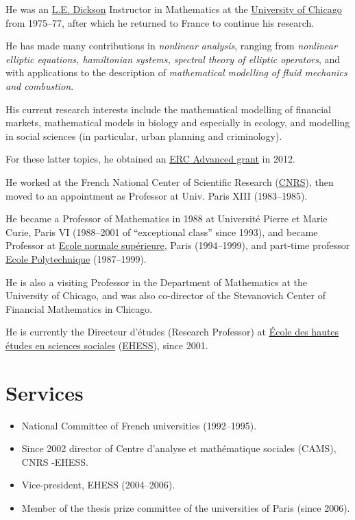 \documentclass{book}
\numberwithin{equation}{section}
\begin{document}
He was an \href{https://en.wikipedia.org/wiki/Leonard_Eugene_Dickson}{L.E. Dickson} Instructor in Mathematics at the \href{https://en.wikipedia.org/wiki/University_of_Chicago}{University of Chicago} from 1975--77, after which he returned to France to continue his research.

He has made many contributions in \textit{nonlinear analysis}, ranging from \textit{nonlinear elliptic equations, hamiltonian systems, spectral theory of elliptic operators}, and with applications to the description of \textit{mathematical modelling of fluid mechanics and combustion}.

His current research interests include the mathematical modelling of financial markets, mathematical models in biology and especially in ecology, and modelling in social sciences (in particular, urban planning and criminology).

For these latter topics, he obtained an \href{http://erc.europa.eu/advanced-grants}{ERC Advanced grant} in 2012.

%
He worked at the French National Center of Scientific Research (\href{https://en.wikipedia.org/wiki/CNRS}{CNRS}), then moved to an appointment as Professor at Univ. Paris XIII (1983--1985).

He became a Professor of Mathematics in 1988 at Université Pierre et Marie Curie, Paris VI (1988--2001 of ``exceptional class'' since 1993), and became Professor at \href{https://en.wikipedia.org/wiki/Ecole_normale_sup%C3%A9rieure}{Ecole normale supérieure}, Paris (1994--1999), and part-time professor \href{https://en.wikipedia.org/wiki/Ecole_Polytechnique}{Ecole Polytechnique} (1987--1999).

He is also a visiting Professor in the Department of Mathematics at the University of Chicago, and was also co-director of the Stevanovich Center of Financial Mathematics in Chicago.

He is currently the Directeur d'études (Research Professor) at \href{https://en.wikipedia.org/wiki/School_for_Advanced_Studies_in_the_Social_Sciences}{École des hautes études en sciences sociales} (\href{https://en.wikipedia.org/wiki/EHESS}{EHESS}), since 2001.

\section{Services}
\begin{itemize}
    \item National Committee of French universities (1992--1995).
    \item Since 2002 director of Centre d'analyse et mathématique sociales (CAMS), CNRS -EHESS.
    \item Vice-president, EHESS (2004--2006).
    \item Member of the thesis prize committee of the universities of Paris (since 2006).
\end{itemize}
\end{document}
